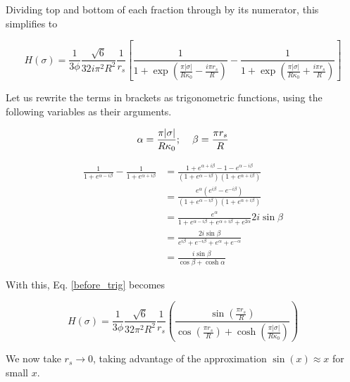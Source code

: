 \documentclass[onecolumn]{aastex63}
\begin{document}
Dividing top and bottom of each fraction through by its numerator, this simplifies to

\begin{equation} \label{before_trig}
    H(\sigma) = \frac{1}{3 \phi} \frac{\sqrt{6}}{32 i \pi^2 R^2} \frac{1}{r_s} \left[\frac{1}{1 + \exp{\left(\frac{\pi |\sigma|}{R\kappa_0} - \frac{i\pi r_s}{R}\right)}}-\frac{1}{1 + \exp{\left(\frac{\pi |\sigma|}{R\kappa_0} + \frac{i\pi r_s}{R}\right)}}\right]
\end{equation}

Let us rewrite the terms in brackets as trigonometric functions, using the following variables as their arguments.

\begin{equation}
    \alpha = \frac{\pi |\sigma|}{R\kappa_0}; \hspace{0.4cm} \beta = \frac{\pi r_s}{R}
\end{equation}

\begin{equation}
    \begin{split}
    \frac{1}{1+e^{\alpha - i\beta}} - \frac{1}{1+e^{\alpha + i\beta}} &= \frac{1+e^{\alpha + i\beta} - 1 - e^{\alpha - i\beta}}{\left(1+e^{\alpha - i\beta}\right)\left(1+e^{\alpha + i\beta}\right)} \\
    &= \frac{e^{\alpha}\left(e^{i\beta} - e^{- i\beta}\right)}{\left(1+e^{\alpha - i\beta}\right)\left(1+e^{\alpha + i\beta}\right)} \\
    &= \frac{e^{\alpha}}{1 + e^{\alpha - i\beta} + e^{\alpha + i\beta} + e^{2\alpha}} 2i \sin{\beta} \\
    &= \frac{2i \sin{\beta}}{e^{i\beta} + e^{- i\beta} + e^{\alpha} + e^{-\alpha}} \\
    &= \frac{i \sin{\beta}}{\cos{\beta} + \cosh{\alpha}}
    \end{split}
\end{equation}

With this, Eq. \ref{before_trig} becomes

\begin{equation} \label{after_trig}
    H(\sigma) = \frac{1}{3 \phi} \frac{\sqrt{6}}{32 \pi^2 R^2} \frac{1}{r_s} \left(\frac{\sin{\left(\frac{\pi r_s}{R}\right)}}{\cos{\left(\frac{\pi r_s}{R}\right)} + \cosh{\left(\frac{\pi |\sigma|}{R\kappa_0}\right)}}\right)
\end{equation}

We now take $r_s \rightarrow 0$, taking advantage of the approximation $\sin(x) \approx x$ for small $x$.
\end{document}
